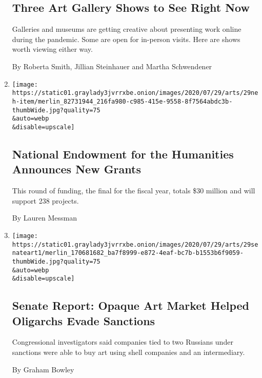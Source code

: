 \begin{enumerate}
  \hypertarget{three-art-gallery-shows-to-see-right-now}{%
  \subsection{Three Art Gallery Shows to See Right
  Now}\label{three-art-gallery-shows-to-see-right-now}}

  Galleries and museums are getting creative about presenting work
  online during the pandemic. Some are open for in-person visits. Here
  are shows worth viewing either way.

  By Roberta Smith, Jillian Steinhauer and Martha Schwendener
\item
  \href{/2020/07/29/arts/national-endowment-for-the-humanities-grants.html}{}

  \texttt{[image: https://static01.graylady3jvrrxbe.onion/images/2020/07/29/arts/29neh-item/merlin\_82731944\_216fa980-c985-415e-9558-8f7564abdc3b-thumbWide.jpg?quality=75\\\&auto=webp\\\&disable=upscale]}

  \hypertarget{national-endowment-for-the-humanities-announces-new-grants}{%
  \subsection{National Endowment for the Humanities Announces New
  Grants}\label{national-endowment-for-the-humanities-announces-new-grants}}

  This round of funding, the final for the fiscal year, totals \$30
  million and will support 238 projects.

  By Lauren Messman
\item
  \href{/2020/07/29/arts/design/senate-report-art-market-russia-oligarchs-sanctions.html}{}

  \texttt{[image: https://static01.graylady3jvrrxbe.onion/images/2020/07/29/arts/29senateart1/merlin\_170681682\_ba7f8999-e872-4eaf-bc7b-b1553b6f9059-thumbWide.jpg?quality=75\\\&auto=webp\\\&disable=upscale]}

  \hypertarget{senate-report-opaque-art-market-helped-oligarchs-evade-sanctions}{%
  \subsection{Senate Report: Opaque Art Market Helped Oligarchs Evade
  Sanctions}\label{senate-report-opaque-art-market-helped-oligarchs-evade-sanctions}}

  Congressional investigators said companies tied to two Russians under
  sanctions were able to buy art using shell companies and an
  intermediary.

  By Graham Bowley
\end{enumerate}

